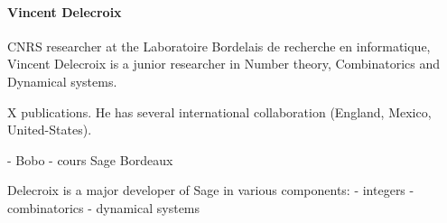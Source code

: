 \paragraph{Vincent Delecroix}


CNRS researcher at the Laboratoire Bordelais de recherche en
informatique, Vincent Delecroix is a junior researcher in Number theory,
Combinatorics and Dynamical systems.

X publications.
He has several international collaboration (England, Mexico, United-States).

- Bobo
- cours Sage Bordeaux

Delecroix is a major developer of Sage in various components:
- integers
- combinatorics
- dynamical systems


